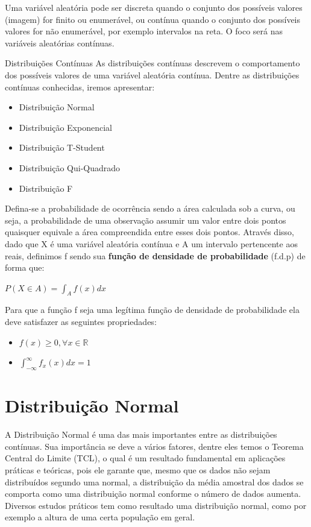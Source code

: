\documentclass[
  letterpaper,
  DIV=11,
  numbers=noendperiod]{scrreprt}
\providecommand{\tightlist}{%
  \setlength{\itemsep}{0pt}\setlength{\parskip}{0pt}}\usepackage{longtable,booktabs,array}
\begin{document}
Uma variável aleatória pode ser discreta quando o conjunto dos possíveis
valores (imagem) for finito ou enumerável, ou contínua quando o conjunto
dos possíveis valores for não enumerável, por exemplo intervalos na
reta. O foco será nas variáveis aleatórias contínuas.

Distribuições Contínuas As distribuições contínuas descrevem o
comportamento dos possíveis valores de uma variável aleatória contínua.
Dentre as distribuições contínuas conhecidas, iremos apresentar:

\begin{itemize}
\tightlist
\item
  Distribuição Normal
\item
  Distribuição Exponencial
\item
  Distribuição T-Student
\item
  Distribuição Qui-Quadrado
\item
  Distribuição F
\end{itemize}

Defina-se a probabilidade de ocorrência sendo a área calculada sob a
curva, ou seja, a probabilidade de uma observação assumir um valor entre
dois pontos quaisquer equivale a área compreendida entre esses dois
pontos. Através disso, dado que X é uma variável aleatória contínua e A
um intervalo pertencente aos reais, definimos f sendo sua \textbf{função
de densidade de probabilidade} (f.d.p) de forma que:

\(P(X \in A) = \int_A f(x)dx\)

Para que a função f seja uma legítima função de densidade de
probabilidade ela deve satisfazer as seguintes propriedades:

\begin{itemize}
\tightlist
\item
  \(f(x) ≥ 0, ∀ x ∈ \mathbb{R}\)
\item
  \(\int_{-∞}^{∞} f_{x}(x)dx = 1\)
\end{itemize}


\hypertarget{distribuiuxe7uxe3o-normal}{%
\chapter{Distribuição Normal}\label{distribuiuxe7uxe3o-normal}}

A Distribuição Normal é uma das mais importantes entre as distribuições
contínuas. Sua importância se deve a vários fatores, dentre eles temos o
Teorema Central do Limite (TCL), o qual é um resultado fundamental em
aplicações práticas e teóricas, pois ele garante que, mesmo que os dados
não sejam distribuídos segundo uma normal, a distribuição da média
amostral dos dados se comporta como uma distribuição normal conforme o
número de dados aumenta. Diversos estudos práticos tem como resultado
uma distribuição normal, como por exemplo a altura de uma certa
população em geral.
\end{document}
